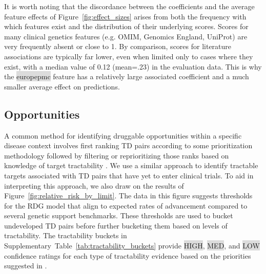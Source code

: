 \documentclass{article}
\begin{document}
It is worth noting that the discordance between the coefficients and the average feature effects of Figure~\ref{fig:effect_sizes} arises from both the frequency with which features exist and the distribution of their underlying scores. Scores for many clinical genetics features (e.g. OMIM, Genomics England, UniProt) are very frequently absent or close to 1. By comparison, scores for literature associations are typically far lower, even when limited only to cases where they exist, with a median value of 0.12 (mean=.23) in the evaluation data. This is why the \colorbox{Gainsboro}{europepmc} feature has a relatively large associated coefficient and a much smaller average effect on predictions.


\subsection{Opportunities}
\label{sec:results_opportunities}

A common method for identifying druggable opportunities within a specific disease context involves first ranking TD pairs according to some prioritization methodology followed by filtering or reprioritizing those ranks based on knowledge of target tractability \cite{PMID:28356508,PMID:35401535,PMID:31253980}. We use a similar approach to identify tractable targets associated with TD pairs that have yet to enter clinical trials. To aid in interpreting this approach, we also draw on the results of Figure~\ref{fig:relative_risk_by_limit}. The data in this figure suggests thresholds for the RDG model that align to expected rates of advancement compared to several genetic support benchmarks. These thresholds are used to bucket undeveloped TD pairs before further bucketing them based on levels of tractability. The tractability buckets in Supplementary~Table~\ref{tab:tractability_buckets} provide \colorbox{Gainsboro}{HIGH}, \colorbox{Gainsboro}{MED}, and \colorbox{Gainsboro}{LOW} confidence ratings for each type of tractability evidence based on the priorities suggested in \cite{OTTractability}.
\end{document}
